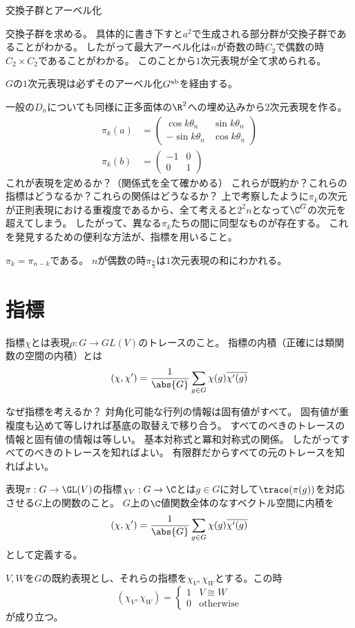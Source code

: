 \documentclass{jsarticle}
\begin{document}
\begin{dfn}
交換子群とアーベル化
\end{dfn}

交換子群を求める。
具体的に書き下すと$a^2$で生成される部分群が交換子群であることがわかる。
したがって最大アーベル化は$n$が奇数の時$C_2$で偶数の時$C_2\times C_2$であることがわかる。
このことから$1$次元表現が全て求められる。

\begin{prop}
$G$の$1$次元表現は必ずそのアーベル化$G^{\rm ab}$を経由する。
\end{prop}

一般の$D_n$についても同様に正多面体の$\R^2$への埋め込みから$2$次元表現を作る。
\begin{align*}
\pi_k(a)&=\begin{pmatrix}\cos k\theta_n&\sin k\theta_n\\-\sin k\theta_n&\cos k\theta_n\end{pmatrix}\\
\pi_k(b)&=\begin{pmatrix}-1&0\\0&1\end{pmatrix}
\end{align*}
これが表現を定めるか？（関係式を全て確かめる）
これらが既約か？これらの指標はどうなるか？これらの関係はどうなるか？
上で考察したように$\pi_k$の次元が正則表現における重複度であるから、全て考えると$2^2n$となって$\C^G$の次元を超えてしまう。
したがって、異なる$\pi_k$たちの間に同型なものが存在する。
これを発見するための便利な方法が、指標を用いること。

$\pi_k=\pi_{n-k}$である。
$n$が偶数の時$\pi_{\frac{n}{2}}$は$1$次元表現の和にわかれる。

\section{指標}
\begin{dfn}
指標$\chi$とは表現$\rho:G\to GL(V)$のトレースのこと。
指標の内積（正確には類関数の空間の内積）とは
\[
(\chi,\chi')=\frac{1}{\abs{G}}\sum_{g\in G}\chi(g)\overline{\chi'(g)}
\]
\end{dfn}
なぜ指標を考えるか？
対角化可能な行列の情報は固有値がすべて。
固有値が重複度も込めて等しければ基底の取替えで移り合う。
すべてのべきのトレースの情報と固有値の情報は等しい。
基本対称式と冪和対称式の関係。
したがってすべてのべきのトレースを知ればよい。
有限群だからすべての元のトレースを知ればよい。

表現$\pi:G\to \GL(V)$の指標$\chi_V:G\to\C$とは$g\in G$に対して$\trace(\pi(g))$を対応させる$G$上の関数のこと。
$G$上の$\C$値関数全体のなすベクトル空間に内積を
\[
(\chi,\chi')=\frac{1}{\abs{G}}\sum_{g\in G}\chi(g)\overline{\chi'(g)}
\]
として定義する。
\begin{thm}[既約表現の指標の直交性]
$V, W$を$G$の既約表現とし、それらの指標を$\chi_V, \chi_W$とする。この時
\[
(\chi_V,\chi_W)=\begin{cases}1&V\cong W\\0&\mbox{otherwise}\end{cases}
\]
が成り立つ。
\end{thm}
\end{document}
